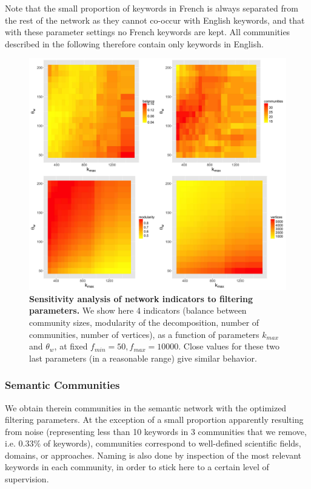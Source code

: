 Note that the small proportion of keywords in French is always separated from the rest of the network as they cannot co-occur with English keywords, and that with these parameter settings no French keywords are kept. All communities described in the following therefore contain only keywords in English.


\begin{figure}
\centering
\includegraphics[width=\linewidth]{figures/Fig6.jpg}
\caption{\textbf{Sensitivity analysis of network indicators to filtering parameters.} We show here 4 indicators (balance between community sizes, modularity of the decomposition, number of communities, number of vertices), as a function of parameters $k_{max}$ and $\theta_w$, at fixed $f_{min} = 50, f_{max} = 10000$. Close values for these two last parameters (in a reasonable range) give similar behavior.}
\label{fig:sensitivity}
\end{figure}





\subsubsection*{Semantic Communities}

We obtain therein communities in the semantic network with the optimized filtering parameters. At the exception of a small proportion apparently resulting from noise (representing less than 10 keywords in 3 communities that we remove, i.e. 0.33\% of keywords), communities correspond to well-defined scientific fields, domains, or approaches. Naming is also done by inspection of the most relevant keywords in each community, in order to stick here to a certain level of supervision.



